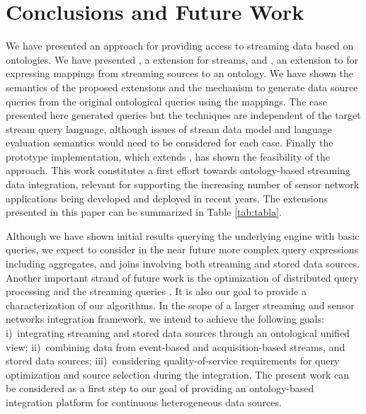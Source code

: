 \section{Conclusions and Future Work}
\label{conclusions}

We have presented an approach for providing access to streaming data based on ontologies.
We have presented \sparqlstr, a \sparql extension for \rdf streams, and \stwoo, an extension to \rtwoo for expressing mappings from streaming sources to an ontology.
We have shown the semantics of the proposed extensions and the mechanism to generate data source queries from the original ontological queries using the mappings.
The case presented here generated \sneeql queries but the techniques are independent of the target stream query language, although issues of stream data model and language evaluation semantics would need to be considered for each case.
Finally the prototype implementation, which extends \odemapster, has shown the feasibility of the approach.
This work constitutes a first effort towards ontology-based streaming data integration, relevant for supporting the increasing number of sensor network applications being developed and deployed in recent years. 
The extensions presented in this paper can be summarized in Table \ref{tab:tabla}.


Although we have shown initial results querying the underlying \snee engine with basic queries, we expect to consider in the near future more complex query expressions including aggregates, and joins involving both streaming and stored data sources.
Another important strand of future work is the optimization of distributed query processing \cite{Kossmann_00} and the streaming queries \cite{Abadi_2005,Galpin_09}.
It is also our goal to provide a characterization of our algorithms. 
In the scope of a larger streaming and sensor networks integration framework, we intend to achieve the following goals: %
i)~integrating streaming and stored data sources through an ontological unified view; %
ii)~combining data from event-based and acquisition-based streams, and stored data sources; %
iii)~considering quality-of-service requirements for query optimization and source selection during the integration.
The present work can be considered as a first step to our goal of providing an ontology-based integration platform for continuous heterogeneous data sources. 

